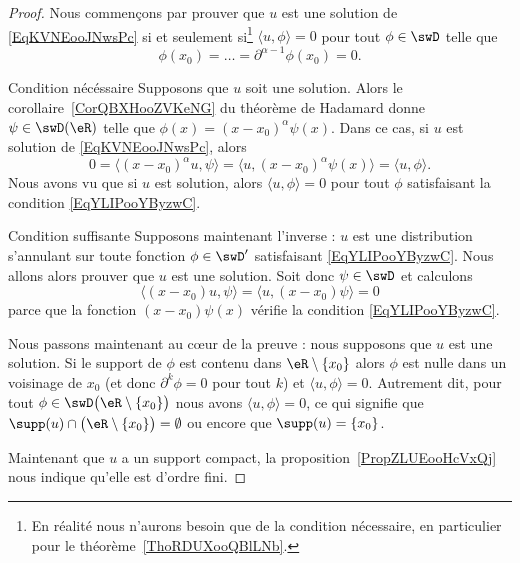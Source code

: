 \begin{proof}
    Nous commençons par prouver que \( u\) est une solution de \eqref{EqKVNEooJNwsPc} si et seulement si\footnote{En réalité nous n'aurons besoin que de la condition nécessaire, en particulier pour le théorème~\ref{ThoRDUXooQBlLNb}.} \( \langle u, \phi\rangle =0\) pour tout \( \phi\in\swD\) telle que
    \begin{equation}    \label{EqYLIPooYByzwC}
        \phi(x_0)=\ldots=\partial^{\alpha-1}\phi(x_0)=0.
    \end{equation}
    \begin{subproof}
    \item[Condition nécéssaire]
    Supposons que \( u\) soit une solution. Alors le corollaire~\ref{CorQBXHooZVKeNG} du théorème de Hadamard donne \( \psi\in\swD(\eR)\) telle que
        $\phi(x)=(x-x_0)^{\alpha}\psi(x)$.
    Dans ce cas, si \( u\) est solution de \eqref{EqKVNEooJNwsPc}, alors
    \begin{equation}
        0=\langle (x-x_0)^{\alpha}u, \psi\rangle =\langle u, (x-x_0)^{\alpha}\psi(x)\rangle =\langle u, \phi\rangle .
    \end{equation}
    Nous avons vu que si \( u\) est solution, alors \( \langle u, \phi\rangle =0\) pour tout \( \phi\) satisfaisant la condition \eqref{EqYLIPooYByzwC}.

\item[Condition suffisante]
    Supposons maintenant l'inverse : \( u\) est une distribution s'annulant sur toute fonction \( \phi\in\swD'\) satisfaisant \eqref{EqYLIPooYByzwC}. Nous allons alors prouver que \( u\) est une solution. Soit donc \( \psi\in \swD\) et calculons
    \begin{equation}
        \langle (x-x_0)u, \psi\rangle =\langle u, (x-x_0)\psi\rangle =0
    \end{equation}
    parce que la fonction \( (x-x_0)\psi(x)\) vérifie la condition \eqref{EqYLIPooYByzwC}.
    \end{subproof}

    Nous passons maintenant au cœur de la preuve : nous supposons que \( u\) est une solution. Si le support de \( \phi\) est contenu dans \( \eR\setminus\{ x_0 \}\) alors \( \phi\) est nulle dans un voisinage de \( x_0\) (et donc \( \partial^k\phi=0\) pour tout \( k\)) et \( \langle u, \phi\rangle =0\). Autrement dit, pour  tout \( \phi\in\swD\big( \eR\setminus\{ x_0 \} \big)\) nous avons \( \langle u, \phi\rangle =0\), ce qui signifie que \( \supp(u)\cap\big( \eR\setminus\{ x_0 \} \big)=\emptyset\) ou encore que \( \supp(u)=\{ x_0 \}\).

    Maintenant que \( u\) a un support compact, la proposition~\ref{PropZLUEooHcVxQj} nous indique qu'elle est d'ordre fini.
\end{proof}

